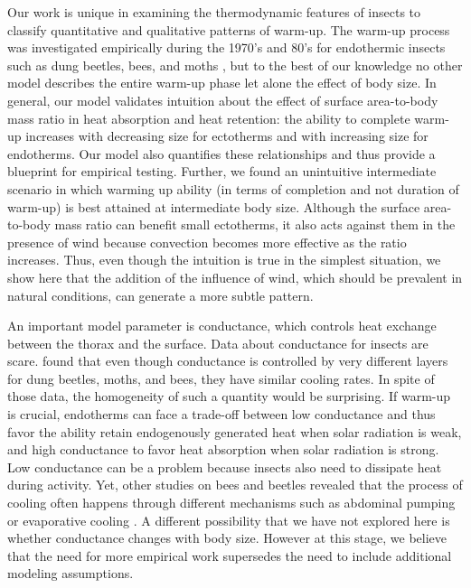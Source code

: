 Our work is unique in examining the thermodynamic features of insects to classify quantitative and qualitative patterns of warm-up.
The warm-up process was investigated empirically during the 1970's and 80's for endothermic insects  such as dung beetles, bees, and moths \citep{Heinrich1975, Bartholomew1978, Bartholomew1981}, but to the best of our knowledge no other model describes the entire warm-up phase let alone the effect of body size.
In general, our model validates intuition about the effect of surface area-to-body mass ratio in heat absorption and heat retention: the ability to complete warm-up increases with decreasing size for ectotherms and with increasing size for endotherms.
Our model also quantifies these relationships and thus provide a blueprint for empirical testing.
Further, we found an unintuitive intermediate scenario in which warming up ability (in terms of completion and not duration of warm-up) is best attained at intermediate body size.
Although the surface area-to-body mass ratio can benefit small ectotherms, it also acts against them in the presence of wind because convection becomes more effective as the ratio increases.
Thus, even though the intuition is true in the simplest situation, we show here that the addition of the influence of wind, which should be prevalent in natural conditions, can generate a more subtle pattern.

An important model parameter is conductance, which controls heat exchange between the thorax and the surface.
Data about conductance for insects are scare.
\citet{Bartholomew1978} found that even though conductance is controlled by very different layers for dung beetles, moths, and bees, they have similar cooling rates. %
In spite of those data, the homogeneity of such a quantity would be surprising. %
If warm-up is crucial, endotherms can face a trade-off between low conductance and thus favor the ability retain endogenously generated heat when solar radiation is weak, and high conductance to favor heat absorption when solar radiation is strong.
Low conductance  can be a problem because insects also need to dissipate heat during activity.
Yet, other studies on bees and beetles revealed that the process of cooling often happens through different mechanisms such as abdominal pumping or evaporative cooling \citep{Heinrich1979, Verdu2012}.
A different possibility that we have not explored here is whether conductance changes with body size.
However at this stage, we believe that the need for more empirical work supersedes the need to include additional modeling assumptions. %

